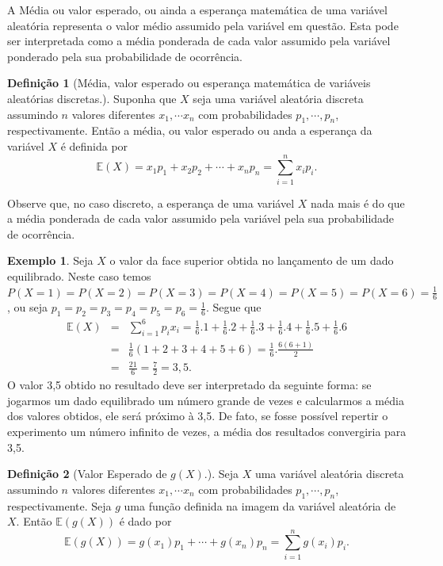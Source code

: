 \documentclass[
]{book}
\theoremstyle{definition}
\newtheorem{definition}{Definição}[chapter]
\theoremstyle{definition}
\newtheorem{example}{Exemplo}[chapter]
\theoremstyle{definition}
\theoremstyle{remark}
\begin{document}
A Média ou valor esperado, ou ainda a esperança matemática de uma variável aleatória representa o valor médio assumido pela variável em questão. Esta pode ser interpretada como a média ponderada de cada valor assumido pela variável ponderado pela sua probabilidade de ocorrência.

\begin{definition}[Média, valor esperado ou esperança matemática de variáveis aleatórias discretas.]
\protect\hypertarget{def:defmean}{}{\label{def:defmean} {} }Suponha que \(X\) seja uma variável aleatória discreta assumindo \(n\) valores diferentes \(x_1,\cdots x_n\) com probabilidades \(p_1,\cdots,p_n\), respectivamente. Então a média, ou valor esperado ou anda a esperança da variável \(X\) é definida por
\[\mathbb{E}(X)=x_1p_1+x_2p_2+\cdots+x_np_n=\sum_{i=1}^nx_ip_i.\]
\end{definition}

Observe que, no caso discreto, a esperança de uma variável \(X\) nada mais é do que a média ponderada de cada valor assumido pela variável pela sua probabilidade de ocorrência.

\begin{example}
\protect\hypertarget{exm:exemploEspdado}{}{\label{exm:exemploEspdado} }Seja \(X\) o valor da face superior obtida no lançamento de um
dado equilibrado. Neste caso temos
\(P(X=1)=P(X=2)=P(X=3)=P(X=4)=P(X=5)=P(X=6)=\frac{1}{6}\), ou seja
\(p_1=p_2=p_3=p_4=p_5=p_6=\frac{1}{6}\). Segue que
\begin{eqnarray*}
\mathbb{E}(X)&=&\sum_{i=1}^6p_ix_i= \frac{1}{6}.1+\frac{1}{6}.2+\frac{1}{6}.3+\frac{1}{6}.4+\frac{1}{6}.5+\frac{1}{6}.6\\
     &=&\frac{1}{6}(1+2+3+4+5+6)=\frac{1}{6}.\frac{6(6+1)}{2}\\
     &=&\frac{21}{6}=\frac{7}{2}=3,5.
\end{eqnarray*}
O valor 3,5 obtido no resultado deve ser interpretado da seguinte forma: se jogarmos um dado equilibrado um número grande de vezes e calcularmos a média dos valores obtidos, ele será próximo à 3,5. De fato, se fosse possível repertir o experimento um número infinito de vezes, a média dos resultados convergiria para 3,5.
\end{example}

\begin{definition}[Valor Esperado de $g(X)$.]
\protect\hypertarget{def:defexper}{}{\label{def:defexper} {} }Seja \(X\) uma variável aleatória discreta assumindo \(n\) valores diferentes \(x_1,\cdots x_n\) com probabilidades \(p_1,\cdots,p_n\), respectivamente. Seja \(g\) uma função definida na imagem da variável aleatória de \(X\). Então \(\mathbb{E}(g(X))\) é dado por
\[\mathbb{E}(g(X))=g(x_1)p_1+ \cdots + g(x_n)p_n=\sum_{i=1}^n g(x_i)p_i.\]
\end{definition}
\end{document}
